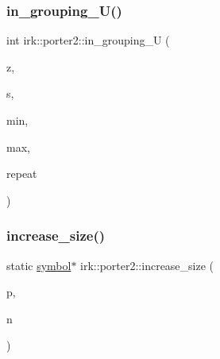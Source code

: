 \mbox{\label{namespaceirk_1_1porter2_ae82885401e05e98bbad5533eb7d749e5}} 
\subsubsection{\texorpdfstring{in\+\_\+grouping\+\_\+\+U()}{in\_grouping\_U()}}
{\footnotesize\ttfamily int irk\+::porter2\+::in\+\_\+grouping\+\_\+U (\begin{DoxyParamCaption}\item[{struct \mbox{\hyperlink{structirk_1_1porter2_1_1SN__env}{S\+N\+\_\+env}} $\ast$}]{z,  }\item[{const unsigned char $\ast$}]{s,  }\item[{int}]{min,  }\item[{int}]{max,  }\item[{int}]{repeat }\end{DoxyParamCaption})}

\mbox{\label{namespaceirk_1_1porter2_ae8cb7033f13a3cf4bb0b904f66a1ebb1}} 
\subsubsection{\texorpdfstring{increase\+\_\+size()}{increase\_size()}}
{\footnotesize\ttfamily static \mbox{\hyperlink{namespaceirk_1_1porter2_afd04c4eb58a1dabcf8f3ab2d7e9f9ed5}{symbol}}$\ast$ irk\+::porter2\+::increase\+\_\+size (\begin{DoxyParamCaption}\item[{\mbox{\hyperlink{namespaceirk_1_1porter2_afd04c4eb58a1dabcf8f3ab2d7e9f9ed5}{symbol}} $\ast$}]{p,  }\item[{int}]{n }\end{DoxyParamCaption})\hspace{0.3cm}{\ttfamily [static]}}

\mbox{\label{namespaceirk_1_1porter2_a0e0f25344d2fa321eec7e9070fafcf67}} 
